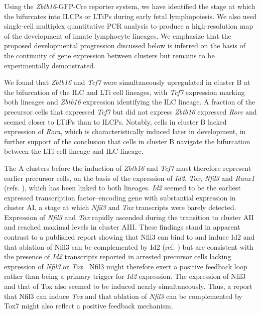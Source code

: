 Using the \textit{Zbtb16}-GFP-Cre reporter system, we have identified the stage at which the \aLP bifurcates into ILCPs or LTiPs during early fetal lymphopoiesis. We also used single-cell multiplex quantitative PCR analysis to produce a high-resolution map of the development of innate lymphocyte lineages. We emphasize that the proposed developmental progression discussed below is inferred on the basis of the continuity of gene expression between clusters but remains to be experimentally demonstrated.

We found that \textit{Zbtb16} and \textit{Tcf7} were simultaneously upregulated in cluster B at the bifurcation of the ILC and LTi cell lineages, with \textit{Tcf7} expression marking both lineages and \textit{Zbtb16} expression identifying the ILC lineage. A fraction of the precursor cells that expressed \textit{Tcf7} but did not express \textit{Zbtb16} expressed \textit{Rorc} and seemed closer to LTiPs than to ILCPs. Notably, cells in cluster B lacked expression of \textit{Rora}, which is characteristically induced later in development, in further support of the conclusion that cells in cluster B navigate the bifurcation between the LTi cell lineage and ILC lineage.

The A clusters before the induction of \textit{Zbtb16} and \textit{Tcf7} must therefore represent earlier precursor cells, on the basis of the expression of \textit{Id2}, \textit{Tox}, \textit{Nfil3} and \textit{Runx1} (refs. \cite{yu2014,xu2015,seillet2014, seehus2015,moro2010,tachibana2011,aliahmad2010,yokota1999}), which has been linked to both lineages. \textit{Id2} seemed to be the earliest expressed transcription factor–encoding gene with substantial expression in cluster AI, a stage at which \textit{Nfil3} and \textit{Tox} transcripts were barely detected. Expression of \textit{Nfil3} and \textit{Tox} rapidly ascended during the transition to cluster AII and reached maximal levels in cluster AIII. These findings stand in apparent contrast to a published report showing that Nfil3 can bind to and induce Id2 and that ablation of Nfil3 can be complemented by Id2 (ref. \cite{xu2015}) but are consistent with the presence of \textit{Id2} transcripts reported in arrested precursor cells lacking expression of \textit{Nfil3} or \textit{Tox} \cite{xu2015,seehus2015}. Nfil3 might therefore exert a positive feedback loop rather than being a primary trigger for \textit{Id2} expression. The expression of Nfil3 and that of Tox also seemed to be induced nearly simultaneously. Thus, a report that Nfil3 can induce \textit{Tox} and that ablation of \textit{Nfil3} can be complemented by Tox7 might also reflect a positive feedback mechanism.

